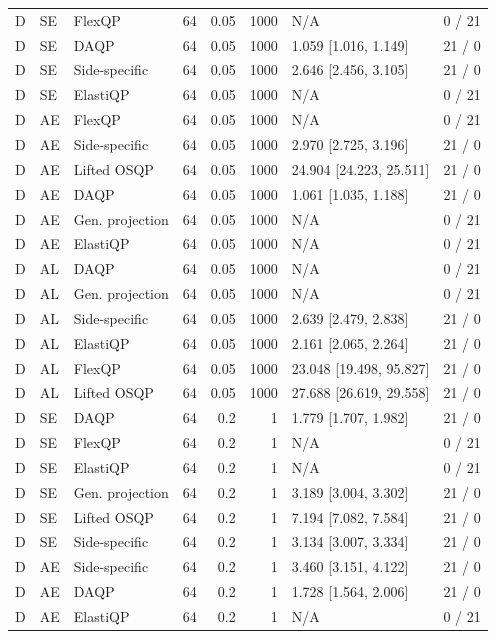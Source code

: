 \begin{longtable}{@{}lllrrrlr@{}}
D & SE & FlexQP & 64 & 0.05 & 1000 & N/A & 0 / 21 \\
D & SE & DAQP & 64 & 0.05 & 1000 & 1.059 [1.016, 1.149] & 21 / 0 \\
D & SE & Side-specific & 64 & 0.05 & 1000 & 2.646 [2.456, 3.105] & 21 / 0 \\
D & SE & ElastiQP & 64 & 0.05 & 1000 & N/A & 0 / 21 \\
D & AE & FlexQP & 64 & 0.05 & 1000 & N/A & 0 / 21 \\
D & AE & Side-specific & 64 & 0.05 & 1000 & 2.970 [2.725, 3.196] & 21 / 0 \\
D & AE & Lifted OSQP & 64 & 0.05 & 1000 & 24.904 [24.223, 25.511] & 21 / 0 \\
D & AE & DAQP & 64 & 0.05 & 1000 & 1.061 [1.035, 1.188] & 21 / 0 \\
D & AE & Gen. projection & 64 & 0.05 & 1000 & N/A & 0 / 21 \\
D & AE & ElastiQP & 64 & 0.05 & 1000 & N/A & 0 / 21 \\
D & AL & DAQP & 64 & 0.05 & 1000 & N/A & 0 / 21 \\
D & AL & Gen. projection & 64 & 0.05 & 1000 & N/A & 0 / 21 \\
D & AL & Side-specific & 64 & 0.05 & 1000 & 2.639 [2.479, 2.838] & 21 / 0 \\
D & AL & ElastiQP & 64 & 0.05 & 1000 & 2.161 [2.065, 2.264] & 21 / 0 \\
D & AL & FlexQP & 64 & 0.05 & 1000 & 23.048 [19.498, 95.827] & 21 / 0 \\
D & AL & Lifted OSQP & 64 & 0.05 & 1000 & 27.688 [26.619, 29.558] & 21 / 0 \\
D & SE & DAQP & 64 & 0.2 & 1 & 1.779 [1.707, 1.982] & 21 / 0 \\
D & SE & FlexQP & 64 & 0.2 & 1 & N/A & 0 / 21 \\
D & SE & ElastiQP & 64 & 0.2 & 1 & N/A & 0 / 21 \\
D & SE & Gen. projection & 64 & 0.2 & 1 & 3.189 [3.004, 3.302] & 21 / 0 \\
D & SE & Lifted OSQP & 64 & 0.2 & 1 & 7.194 [7.082, 7.584] & 21 / 0 \\
D & SE & Side-specific & 64 & 0.2 & 1 & 3.134 [3.007, 3.334] & 21 / 0 \\
D & AE & Side-specific & 64 & 0.2 & 1 & 3.460 [3.151, 4.122] & 21 / 0 \\
D & AE & DAQP & 64 & 0.2 & 1 & 1.728 [1.564, 2.006] & 21 / 0 \\
D & AE & ElastiQP & 64 & 0.2 & 1 & N/A & 0 / 21 \\

\end{longtable}
